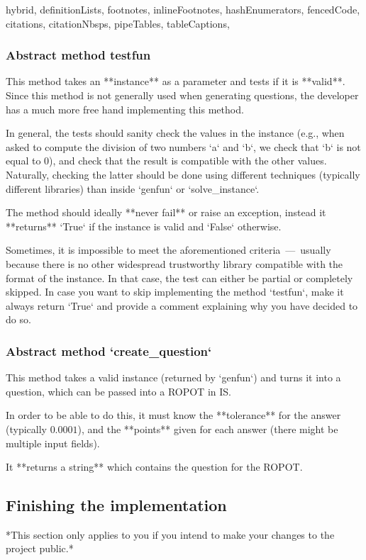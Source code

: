 \documentclass[
  digital, %
  table,   %
  twoside, %
  nolof,     %
  nolot,     %
  draft=false,
  final,
]{fithesis3}
\begin{document}
\begin{markdown*}{%
  hybrid,
  definitionLists,
  footnotes,
  inlineFootnotes,
  hashEnumerators,
  fencedCode,
  citations,
  citationNbsps,
  pipeTables,
  tableCaptions,
}
\subsubsection{Abstract method testfun} 

This method takes an **instance** as a parameter and tests if it is **valid**. Since this method is not generally used when generating questions, the developer has a much more free hand implementing this method.

In general, the tests should sanity check the values in the instance (e.g., when asked to compute the division of two numbers `a` and `b`, we check that `b` is not equal to 0), and check that the result is compatible with the other values. Naturally, checking the latter should be done using different techniques (typically different libraries) than inside `genfun` or `solve_instance`.

The method should ideally **never fail** or raise an exception, instead it **returns**
`True` if the instance is valid and `False` otherwise.

Sometimes, it is impossible to meet the aforementioned criteria~---~usually because there is no other widespread trustworthy library compatible with the format of the instance. In that case, the test can either be partial or completely skipped. In case you want to skip implementing the method `testfun`, make it always return `True` and provide a comment explaining why you have decided to do so.

\subsubsection[Abstract method create_question]{Abstract method `create_question`} 

This method takes a valid instance (returned by `genfun`) and turns it into a question,
which can be passed into a ROPOT in IS. 

In order to be able to do this, it must know the **tolerance** for the answer (typically $0.0001$),
and the **points** given for each answer (there might be multiple input fields).

It **returns a string** which contains the question for the ROPOT.

\subsection{Finishing the implementation}

*This section only applies to you if you intend to make your changes to the project public.*


\end{markdown*}
\end{document}
